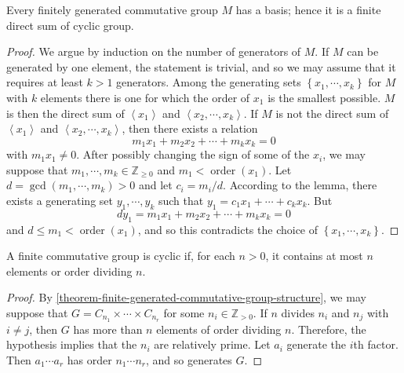 \begin{theorem}
  \label{theorem-finite-generated-commutative-group-structure}
  Every finitely generated commutative group \( M \) has a basis;
  hence it is a finite direct sum of cyclic group.
\end{theorem}
\begin{proof}
  We argue by induction on the number of generators of \( M \). If \( M \) can
  be generated by one element, the statement is trivial, and so we may assume
  that it requires at least \( k > 1 \) generators. Among the generating sets \(
  \left\lbrace x_1, \cdots, x_k \right\rbrace \) for \( M \) with \( k \)
  elements there is one for which the order of \( x_1 \) is the smallest
  possible. \( M \) is then the direct sum of \( \left\langle x_1 \right\rangle
  \) and \( \left\langle x_2, \cdots, x_k \right\rangle \). If \( M \) is not
  the direct sum of \( \left\langle x_1 \right\rangle \) and \( \left\langle
  x_2, \cdots, x_k \right\rangle \), then there exists a relation
  \[
    m_1 x_1 + m_2 x_2 + \cdots + m_k x_k = 0
  \]
  with \( m_1 x_1 \neq 0 \). After possibly changing the sign of some of the \(
  x_i \), we may suppose that \( m_1, \cdots, m_k \in \mathbb{Z}_{\geq 0} \) and
  \( m_1 < \operatorname{order}(x_1) \). Let \( d = \gcd (m_1, \cdots, m_k) > 0
  \) and let \( c_i = m_i / d \). According to the lemma, there exists a
  generating set \( y_1, \cdots, y_k \) such that \( y_1 = c_1 x_1 + \cdots +
  c_k x_k \). But
  \[
    d y_1 = m_1 x_1 + m_2 x_2 + \cdots + m_k x_k = 0
  \]
  and \( d \leq m_1 < \operatorname{order}(x_1) \), and so this contradicts the
  choice of \( \left\lbrace x_1, \cdots, x_k \right\rbrace \).
\end{proof}

\begin{corollary}
  \label{corollary-finite-cyclic-property}
  A finite commutative group is cyclic if, for each \( n > 0 \), it contains at
  most \( n \) elements or order dividing \( n \).
\end{corollary}
\begin{proof}
  By \cref{theorem-finite-generated-commutative-group-structure}, we may suppose
  that \( G = C_{n_1} \times \cdots \times C_{n_r} \) for some \( n_i \in
  \mathbb{Z}_{> 0} \). If \( n \) divides \( n_i \) and \( n_j \) with \( i \neq
  j \), then \( G \) has more than \( n \) elements of order dividing \( n \).
  Therefore, the hypothesis implies that the \( n_i \) are relatively prime. Let
  \( a_i \) generate the \( i \)th factor. Then \( a_1 \cdots a_r \) has
  order \( n_1\cdots n_r \), and so generates \( G \).
\end{proof}

